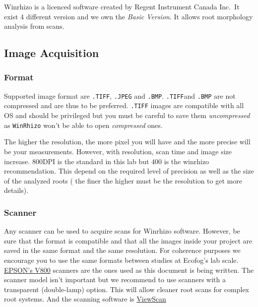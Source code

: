 \documentclass[
  12pt,
  american,
  a4paper,
  extrafontsizes,onecolumn,openright
  ]{memoir}
\begin{document}
Winrhizo is a licenced software created by Regent Instrument Canada Inc.~It exist 4 different version and we own the \emph{Basic Version}. It allows root morphology analysis from scans.

\hypertarget{image-acquisition}{%
\subsection{Image Acquisition}\label{image-acquisition}}

\hypertarget{format}{%
\subsubsection{Format}\label{format}}

Supported image format are \texttt{.TIFF}, \texttt{.JPEG} and \texttt{.BMP}. \texttt{.TIFF}and \texttt{.BMP} are not compressed and are thus to be preferred. \texttt{.TIFF} images are compatible with all OS and should be privileged but you must be careful to save them \emph{uncompressed} as \texttt{WinRhizo} won't be able to open \emph{compressed} ones.

The higher the resolution, the more pixel you will have and the more precise will be your measurements. However, with resolution, scan time and image size increase. 800DPI is the standard in this lab but 400 is the winrhizo recommendation. This depend on the required level of precision as well as the size of the analyzed roots ( the finer the higher must be the resolution to get more details).

\hypertarget{scanner}{%
\subsubsection{Scanner}\label{scanner}}

Any scanner can be used to acquire scans for Winrhizo software. However, be sure that the format is compatible and that all the images inside your project are saved in the same format and the same resolution. For coherence purposes we encourage you to use the same formats between studies at Ecofog's lab scale.
\href{document/machine/EPSON_V800/usersguide.pdf}{EPSON's V800} scanners are the ones used as this document is being written. The scanner model isn't important but we recommend to use scanners with a transparent (double-lamp) option. This will allow cleaner root scans for complex root systems.
And the scanning software is \href{document/software/Viewscan/Parametre_Scanner.pdf}{ViewScan}
\end{document}
